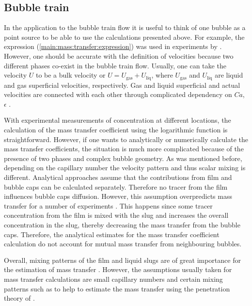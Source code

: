 \documentclass[review,12pt]{elsarticle}
\newcommand{\uliq}{U_{\mathrm{liq}}}
\newcommand{\ugas}{U_{\mathrm{gas}}}
\begin{document}
\subsection{Bubble train}
In the application to the bubble train flow it is useful to think of one bubble as a point
source to be able to use the calculations presented above. For example, the expression
(\ref{main:mass:transfer:expression}) was used in experiments by
\citet{bercic-mass}. However, one should be accurate with the definition of velocities because two
different phases co-exist in the bubble train flow. Usually, one can take the velocity $U$ to be
a bulk velocity or $U=\ugas+\uliq$, where $\ugas$ and $\uliq$ are liquid and gas
superficial velocities, respectively. {\color{red} Gas and liquid superficial and actual velocities are connected with each other through complicated dependency on $Ca$, $\epsilon$ \cite{kuzmin-binary3d}.}

With experimental measurements of concentration at different locations, the calculation
of the mass transfer coefficient using the logarithmic function is straightforward.
However, if one wants to analytically or numerically calculate the mass transfer coefficients, the
situation is much more complicated because of the presence of two phases and complex bubble
geometry. As was mentioned before, depending on the capillary
number the velocity pattern and thus scalar mixing is different. Analytical approaches
\cite{irandoust,vanbaten-circular} assume that the
contributions from film and bubble caps can be calculated separately. Therefore no tracer from the film influences bubble caps diffusion.   However, this assumption overpredicts mass transfer for a number of experiments \cite{irandoust}. This happens since some tracer
concentration from the film is mixed with the slug and increases the overall concentration in the slug, thereby decreasing
the mass transfer from the bubble caps.
Therefore, the analytical estimates for the mass transfer coefficient calculation  do not account for mutual mass
transfer from neighbouring bubbles.

Overall, mixing patterns of the film and liquid slugs are of great importance for the 
estimation of mass transfer \cite{yue-mass}. However, the assumptions usually taken for 
mass transfer calculations are small capillary numbers and certain mixing patterns such as to help to
estimate the mass transfer using the penetration theory of \citet{higbie}.
\end{document}
